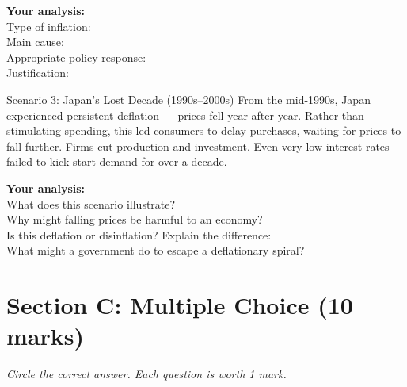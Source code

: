 \documentclass[12pt,a4paper]{article}
\begin{document}
\vspace{0.5em}
\textbf{Your analysis:}\\
Type of inflation: \dotfill \\[0.4em]
Main cause: \dotfill \\[0.4em]
Appropriate policy response: \dotfill \\[0.4em]
Justification: \dotfill

\vspace{1em}

\begin{scenario}{Scenario 3: Japan's Lost Decade (1990s--2000s)}
    From the mid-1990s, Japan experienced persistent deflation --- prices fell year after year. Rather than stimulating spending, this led consumers to delay purchases, waiting for prices to fall further. Firms cut production and investment. Even very low interest rates failed to kick-start demand for over a decade.
\end{scenario}

\vspace{0.5em}
\textbf{Your analysis:}\\
What does this scenario illustrate? \dotfill \\[0.4em]
Why might falling prices be harmful to an economy? \dotfill \\[0.4em]
Is this deflation or disinflation? Explain the difference: \dotfill \\[0.4em]
What might a government do to escape a deflationary spiral? \dotfill

\newpage

\section*{Section C: Multiple Choice (10 marks)}

\textit{Circle the correct answer. Each question is worth 1 mark.}

\vspace{0.5em}
\end{document}
